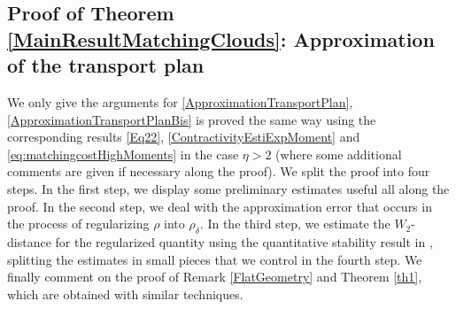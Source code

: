 \documentclass[11pt,a4paper,oneside]{amsart}
\numberwithin{equation}{section}
\newtheorem{lemma}[theorem]{Lemma}
\newcommand{\dd}{\mathrm{d}}
\newcommand{\LL}{\mathrm{L}}
\begin{document}
%
%
%
%
%
%
%



\subsection{Proof of Theorem \ref{MainResultMatchingClouds}: Approximation of the transport plan}\label{ProofTransport}
%
We only give the arguments for \eqref{ApproximationTransportPlan}, \eqref{ApproximationTransportPlanBis} is proved the same way using the corresponding results \eqref{Eq22}, \eqref{ContractivityEstiExpMoment} and \eqref{eq:matchingcostHighMoments} in the case $\eta>2$ (where some additional comments are given if necessary along the proof). We split the proof into four steps. In the first step, we display some preliminary estimates useful all along the proof. In the second step, we deal with the approximation error that occurs in the process of regularizing $\rho$ into $\rho_\delta$. In the third step, we estimate the $W_2$-distance for the regularized quantity using the quantitative stability result in \cite[Theorem 3.2]{ambrosio2019optimal}, splitting the estimates in small pieces that we control in the fourth step. We finally comment on the proof of Remark \ref{FlatGeometry} and Theorem \ref{th1}, which are obtained with similar techniques.

%
\medskip
%
\end{document}
